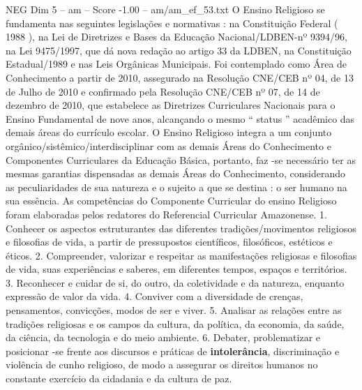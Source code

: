 \begin{textsample}{NEG Dim 5 – am – Score -1.00 – am/am\_ef\_53.txt}  \label{ex:f5_neg_226}
O Ensino Religioso se fundamenta nas seguintes legislações e normativas : na Constituição Federal ( 1988 ), na Lei de Diretrizes e Bases da Educação Nacional/LDBEN-nº 9394/96, na Lei 9475/1997, que dá nova redação ao artigo 33 da LDBEN, na Constituição Estadual/1989 e nas Leis Orgânicas Municipais.
Foi contemplado como Área de Conhecimento a partir de 2010, assegurado na Resolução CNE/CEB nº 04, de 13 de Julho de 2010 e confirmado pela Resolução CNE/CEB nº 07, de 14 de dezembro de 2010, que estabelece as Diretrizes Curriculares Nacionais para o Ensino Fundamental de nove anos, alcançando o mesmo “ status ” acadêmico das demais áreas do currículo escolar.
O Ensino Religioso integra a um conjunto orgânico/sistêmico/interdisciplinar com as demais Áreas do Conhecimento e Componentes Curriculares da Educação Básica, portanto, faz -se necessário ter as mesmas garantias dispensadas as demais Áreas do Conhecimento, considerando as peculiaridades de sua natureza e o sujeito a que se destina : o ser humano na sua essência.
As competências do Componente Curricular do ensino Religioso foram elaboradas pelos redatores do Referencial Curricular Amazonense. 1.
Conhecer os aspectos estruturantes das diferentes tradições/movimentos religiosos e filosofias de vida, a partir de pressupostos científicos, filosóficos, estéticos e éticos. 2.
Compreender, valorizar e respeitar as manifestações religiosas e filosofias de vida, suas experiências e saberes, em diferentes tempos, espaços e territórios. 3.
Reconhecer e cuidar de si, do outro, da coletividade e da natureza, enquanto expressão de valor da vida. 4.
Conviver com a diversidade de crenças, pensamentos, convicções, modos de ser e viver. 5.
Analisar as relações entre as tradições religiosas e os campos da cultura, da política, da economia, da saúde, da ciência, da tecnologia e do meio ambiente. 6.
Debater, problematizar e posicionar -se frente aos discursos e práticas de \textbf{intolerância}, discriminação e violência de cunho religioso, de modo a assegurar os direitos humanos no constante exercício da cidadania e da cultura de paz.

\end{textsample}

